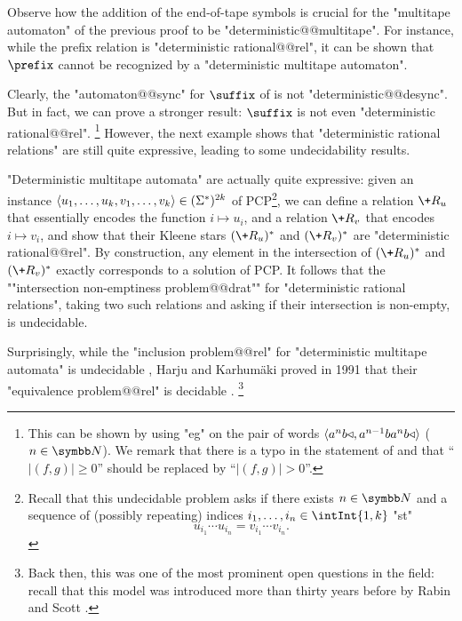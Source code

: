 Observe how the addition of the end-of-tape symbols is crucial for the "multitape automaton"
of the previous proof to be "deterministic@@multitape". For instance, while
the prefix relation is "deterministic rational@@rel", it can be shown that
$\prefix$ cannot be recognized by a "deterministic multitape automaton".

Clearly, the "automaton@@sync" for $\suffix$ of  is not "deterministic@@desync".
But in fact, we can prove a stronger result: $\suffix$ is not even "deterministic rational@@rel".%
\footnote{This can be shown by using "eg"
\cite[Lemma~IV.5.15]{Sakarovitch2009Elements} on the pair of words
$\langle a^n b \triangleleft, a^{n-1} b a^n b \triangleleft\rangle$ ($n\in\N$).
We remark that there is a typo in
the statement of \cite[Lemma~IV.5.15]{Sakarovitch2009Elements} and that
``$|(f,g)| \geq 0$'' should be replaced by ``$|(f,g)| > 0$''.}
However, the next example shows that "deterministic rational relations" are still quite expressive,
leading to some undecidability results.

\begin{example}
	\AP\label{ex:PCP-is-det-rat}
	"Deterministic multitape automata" are actually quite expressive:
	given an instance $\langle u_1,\dotsc,u_k, v_1,\dotsc,v_k\rangle \in (\Sigma^*)^{2k}$ 
	of PCP\footnote{Recall that this undecidable problem asks if there exists $n\in\N$
	and a sequence of (possibly repeating)
	indices $i_1,\dotsc, i_n \in \intInt{1,k}$ "st"
	\[u_{i_1}\cdots u_{i_n} = v_{i_1}\cdots v_{i_n}.\]},
	we can define a relation $\+R_u$ that essentially encodes the function
	$i \mapsto u_i$, and a relation $\+R_v$ that encodes $i \mapsto v_i$,
	and show that their Kleene stars $(\+R_u)^*$ and $(\+R_v)^*$ are "deterministic rational@@rel".
	By construction, any element in the intersection of $(\+R_u)^*$ and $(\+R_v)^*$
	exactly corresponds to a solution of PCP.
	It follows that the \AP""intersection non-emptiness problem@@drat""
	for "deterministic rational relations",
	taking two such relations and asking if their intersection is non-empty, is undecidable.
\end{example}

Surprisingly, while the "inclusion problem@@rel" for "deterministic multitape automata" is undecidable
\cite{FischerRosenberg1968Multitape}, Harju and Karhumäki proved in 1991 that their
"equivalence problem@@rel"
is decidable \cite[Theorem~3.11]{HarjuKarhumaki1991Equivalence}.%
\footnote{Back then, this was one of the most prominent open questions in the field: recall that 
this model was introduced more than thirty years before by Rabin
and Scott \cite{RabinScott1959FiniteAutomata}.}


